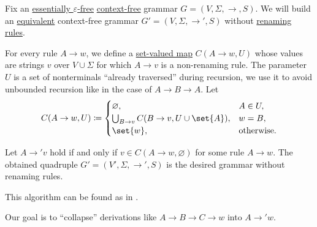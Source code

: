 \begin{algorithm}\label{alg:renaming_rule_collapse}
  Fix an \hyperref[def:epsilon_free_grammar]{essentially \( \varepsilon \)-free} \hyperref[def:chomsky_hierarchy/context_free]{context-free} grammar \( G = (V, \Sigma, \to, S) \). We will build an \hyperref[def:formal_grammar/equivalent]{equivalent} context-free grammar \( G' = (V, \Sigma, \to', S) \) without \hyperref[def:renaming_rule]{renaming rules}.

  \begin{thmenum}
     For every rule \( A \to w \), we define a \hyperref[def:function]{set-valued map} \( C(A \to w, U) \) whose values are strings \( v \) over \( V \cup \Sigma \) for which \( A \to v \) is a non-renaming rule. The parameter \( U \) is a set of nonterminals \enquote{already traversed} during recursion, we use it to avoid unbounded recursion like in the case of \( A \to B \to A \). Let
    \begin{equation*}
      C(A \to w, U) \coloneqq \begin{cases}
        \varnothing,                                    &A \in U, \\
        \bigcup_{B \to v} C(B \to v, U \cup \set{ A }), &w = B, \\
        \set{ w },                                      &\T{otherwise.}
      \end{cases}
    \end{equation*}

     Let \( A \to' v \) hold if and only if \( v \in C(A \to w, \varnothing) \) for some rule \( A \to w \). The obtained quadruple \( G' = (V', \Sigma, \to', S) \) is the desired grammar without renaming rules.
  \end{thmenum}
\end{algorithm}
\begin{comments}
  \item This algorithm can be found as  in \cite{notebook:code}.
  \item Our goal is to \enquote{collapse} derivations like \( A \to B \to C \to w \) into \( A \to' w \).
\end{comments}

